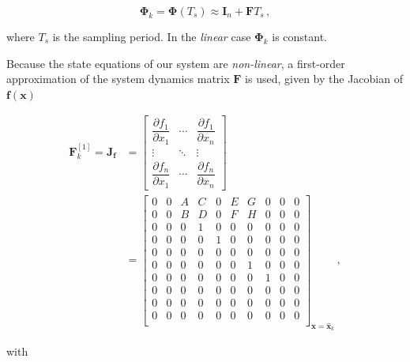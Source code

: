 \begin{equation}
  \bm{\Phi}_{k} = \bm{\Phi}(T_s) \approx \mathbf{I}_{n} + \mathbf{F} T_s\,,
\end{equation}

\noindent
where $T_s$ is the sampling period. In the \emph{linear} case $\bm{\Phi}_{k}$ is constant.

Because the state equations of our system are \emph{non-linear}, a first-order approximation of the system dynamics matrix $\mathbf{F}$ is used, given by the Jacobian of $\mathbf{f}(\mathbf{x})$

\begin{equation}
\begin{split}
\mathbf{F}^{[1]}_k = \mathbf{J}_{\mathbf{f}} &= \begin{bmatrix}
    \dfrac{\partial f_1}{\partial x_1} & \cdots & \dfrac{\partial f_1}{\partial x_{n}}\\
    \vdots & \ddots & \vdots\\
    \dfrac{\partial f_{n}}{\partial x_1} & \cdots & \dfrac{\partial f_{n}}{\partial x_{n}} \end{bmatrix} \\
&=\begin{bmatrix}
  0 & 0 & A & C & 0 & E & G & 0 & 0 & 0\\
  0 & 0 & B & D & 0 & F & H & 0 & 0 & 0\\
  0 & 0 & 0 & 1 & 0 & 0 & 0 & 0 & 0 & 0\\
  0 & 0 & 0 & 0 & 1 & 0 & 0 & 0 & 0 & 0\\
  0 & 0 & 0 & 0 & 0 & 0 & 0 & 0 & 0 & 0\\
  0 & 0 & 0 & 0 & 0 & 0 & 1 & 0 & 0 & 0\\
  0 & 0 & 0 & 0 & 0 & 0 & 0 & 1 & 0 & 0\\
  0 & 0 & 0 & 0 & 0 & 0 & 0 & 0 & 0 & 0\\
  0 & 0 & 0 & 0 & 0 & 0 & 0 & 0 & 0 & 0\\
  0 & 0 & 0 & 0 & 0 & 0 & 0 & 0 & 0 & 0\\
\end{bmatrix}_{\mathbf{x}=\hat{\mathbf{x}}_{k}}\,,
\end{split}
\end{equation}

\noindent
with

